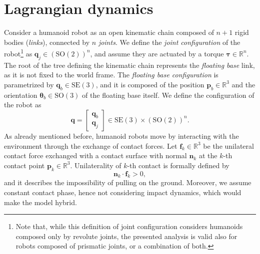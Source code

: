 \section{Lagrangian dynamics}
\label{sec:lagrangian-dynamics}
Consider a humanoid robot as an open kinematic chain composed of $n+1$ rigid bodies
(\textit{links}), connected by $n$ \textit{joints}. We define the \textit{joint
configuration} of the robot\footnote{Note that, while this definition of
joint configuration considers
humanoids composed only by revolute joints, the presented analysis is valid also for
robots composed of prismatic joints, or a combination of both.} as $\bm{q}_j \in \left(\mathrm{SO}(2)\right)^n$, and assume they
are actuated by a torque $\bm{\tau} \in \mathbb{R}^n$. The root of the tree defining the
kinematic chain represents the \textit{floating base} link, as it is not fixed to the
world frame. The \textit{floating base configuration} is parametrized by
$\bm{q}_b \in \mathrm{SE}(3)$, and it is composed of the position
$\bm{p}_b \in \mathbb{R}^3$ and the orientation $\bm{\theta}_b \in \mathrm{SO}(3)$
of the floating base itself. We define the configuration of the robot as
\begin{equation*}
    \bm{q} =
    \begin{bmatrix}
        \bm{q}_b \\ \bm{q}_j
    \end{bmatrix} \in \mathrm{SE}(3) \times \left(\mathrm{SO}(2)\right)^{n}.
\end{equation*}
As already mentioned before, humanoid robots move by interacting with the 
environment through the exchange of contact forces. Let $\bm{f}_k \in \mathbb{R}^3$
be the unilateral contact force exchanged with a contact surface
with normal $\bm{n}_k$ at the $k$-th 
contact point $\bm{p}_k\in\mathbb{R}^3$. Unilaterality of $k$-th contact is formally
defined by
\begin{equation*}
    \bm{n}_k \cdot \bm{f}_k > 0,
\end{equation*}
and it describes the impossibility of pulling on the ground. Moreover, we
assume constant contact phase, hence not considering impact dynamics, which
would make the model hybrid.

